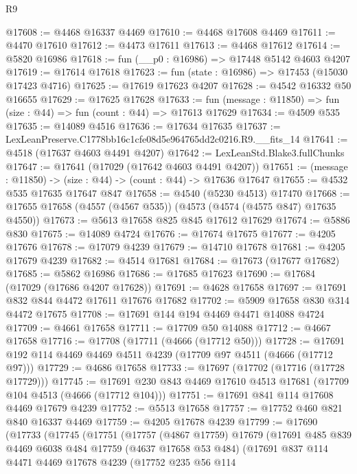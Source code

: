 \begin{lexlean}{R9}
\begin{coremodule}
@17608 := @4468 @16337 @4469
@17610 := @4468 @17608 @4469
@17611 := @4470 @17610
@17612 := @4473 @17611
@17613 := @4468 @17612
@17614 := @5820 @16986
@17618 := fun (__p0 : @16986) => @17448 @5142 @4603 @4207
@17619 := @17614 @17618
@17623 := fun (state : @16986) => @17453 (@15030 @17423 @4716)
@17625 := @17619 @17623 @4207
@17628 := @4542 @16332 @50 @16655
@17629 := @17625 @17628
@17633 := fun (message : @11850) => fun (size : @44) => fun (count : @44) => @17613 @17629
@17634 := @4509 @535
@17635 := @14089 @4516
@17636 := @17634 @17635
@17637 := LexLeanPreserve.C1778bb16c1cfe08d5e964765dd2c0216.R9.__fits_14
@17641 := @4518 (@17637 @4603 @4491 @4207)
@17642 := LexLeanStd.Blake3.fullChunks
@17647 := @17641 (@17029 (@17642 @4603 @4491 @4207))
@17651 := (message : @11850) -> (size : @44) -> (count : @44) -> @17636 @17647
@17655 := @4532 @535 @17635 @17647 @847
@17658 := @4540 (@5230 @4513) @17470
@17668 := @17655 @17658 (@4557 (@4567 @535)) (@4573 (@4574 (@4575 @847) @17635 @4550))
@17673 := @5613 @17658 @825 @845 @17612 @17629
@17674 := @5886 @830
@17675 := @14089 @4724
@17676 := @17674 @17675
@17677 := @4205 @17676
@17678 := @17079 @4239
@17679 := @14710 @17678
@17681 := @4205 @17679 @4239
@17682 := @4514 @17681
@17684 := @17673 (@17677 @17682)
@17685 := @5862 @16986
@17686 := @17685 @17623
@17690 := @17684 (@17029 (@17686 @4207 @17628))
@17691 := @4628 @17658
@17697 := @17691 @832 @844 @4472 @17611 @17676 @17682
@17702 := @5909 @17658 @830 @314 @4472 @17675
@17708 := @17691 @144 @194 @4469 @4471 @14088 @4724
@17709 := @4661 @17658
@17711 := @17709 @50 @14088
@17712 := @4667 @17658
@17716 := @17708 (@17711 (@4666 (@17712 @50)))
@17728 := @17691 @192 @114 @4469 @4469 @4511 @4239 (@17709 @97 @4511 (@4666 (@17712 @97)))
@17729 := @4686 @17658
@17733 := @17697 (@17702 (@17716 (@17728 @17729)))
@17745 := @17691 @230 @843 @4469 @17610 @4513 @17681 (@17709 @104 @4513 (@4666 (@17712 @104)))
@17751 := @17691 @841 @114 @17608 @4469 @17679 @4239
@17752 := @5513 @17658
@17757 := @17752 @460 @821 @840 @16337 @4469
@17759 := @4205 @17678 @4239
@17799 := @17690
    (@17733
      (@17745
        (@17751
          (@17757
            (@4867 @17759)
            @17679
            (@17691
              @485
              @839
              @4469
              @6038
              @484
              @17759
              (@4637 @17658 @53 @484)
              (@17691
                @837
                @114
                @4471
                @4469
                @17678
                @4239
                (@17752
                  @235
                  @56
                  @114

\end{coremodule}
\end{lexlean}
